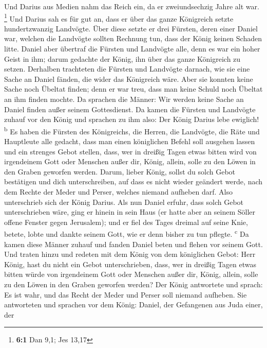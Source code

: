  Und Darius aus Medien nahm das Reich ein, da er
zweiundsechzig Jahre alt war. \footnote{\textbf{6:1} Dan 9,1; Jes 13,17}
 Und Darius sah es für gut an, dass er über das ganze
Königreich setzte hundertzwanzig Landvögte.  Über diese
setzte er drei Fürsten, deren einer Daniel war, welchen die Landvögte
sollten Rechnung tun, dass der König keinen Schaden litte.
 Daniel aber übertraf die Fürsten und Landvögte alle, denn
es war ein hoher Geist in ihm; darum gedachte der König, ihn über das
ganze Königreich zu setzen.  Derhalben trachteten die
Fürsten und Landvögte darnach, wie sie eine Sache an Daniel fänden, die
wider das Königreich wäre. Aber sie konnten keine Sache noch Übeltat
finden; denn er war treu, dass man keine Schuld noch Übeltat an ihm
finden mochte.  Da sprachen die Männer: Wir werden keine
Sache an Daniel finden außer seinem Gottesdienst.  Da
kamen die Fürsten und Landvögte zuhauf vor den König und sprachen zu ihm
also: Der König Darius lebe ewiglich! \textsuperscript{b} 
Es haben die Fürsten des Königreichs, die Herren, die Landvögte, die
Räte und Hauptleute alle gedacht, dass man einen königlichen Befehl soll
ausgehen lassen und ein strenges Gebot stellen, dass, wer in dreißig
Tagen etwas bitten wird von irgendeinem Gott oder Menschen außer dir,
König, allein, solle zu den Löwen in den Graben geworfen werden.
 Darum, lieber König, sollst du solch Gebot bestätigen und
dich unterschreiben, auf dass es nicht wieder geändert werde, nach dem
Rechte der Meder und Perser, welches niemand aufheben darf.
 Also unterschrieb sich der König Darius. 
Als nun Daniel erfuhr, dass solch Gebot unterschrieben wäre, ging er
hinein in sein Haus (er hatte aber an seinem Söller offene Fenster gegen
Jerusalem); und er fiel des Tages dreimal auf seine Knie, betete, lobte
und dankte seinem Gott, wie er denn bisher zu tun pflegte.
\textsuperscript{c}  Da kamen diese Männer zuhauf und
fanden Daniel beten und flehen vor seinem Gott.  Und
traten hinzu und redeten mit dem König von dem königlichen Gebot: Herr
König, hast du nicht ein Gebot unterschrieben, dass, wer in dreißig
Tagen etwas bitten würde von irgendeinem Gott oder Menschen außer dir,
König, allein, solle zu den Löwen in den Graben geworfen werden? Der
König antwortete und sprach: Es ist wahr, und das Recht der Meder und
Perser soll niemand aufheben.  Sie antworteten und
sprachen vor dem König: Daniel, der Gefangenen aus Juda einer, der
